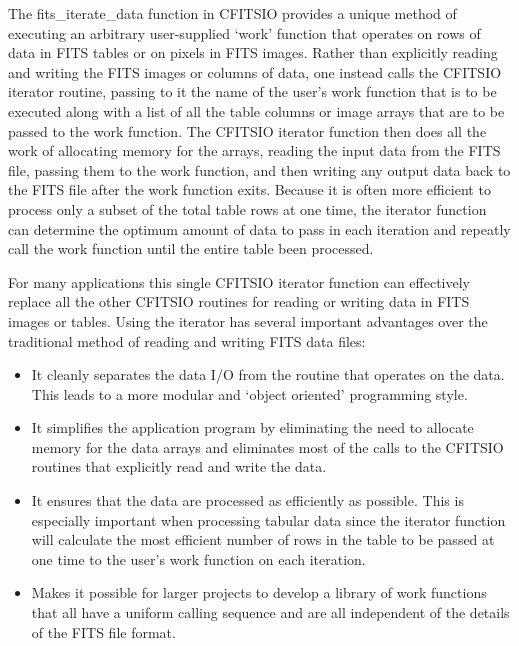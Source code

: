 \documentclass[11pt]{book}
\begin{document}
The fits\_iterate\_data function in CFITSIO provides a unique method of
executing an arbitrary user-supplied `work' function that operates on
rows of data in  FITS tables or on pixels in FITS images.  Rather than
explicitly reading and writing the FITS images or columns of data, one
instead calls the CFITSIO iterator routine, passing to it the name of
the user's work function that is to be executed along with a list of
all the table columns or image arrays that are to be passed to the work
function.  The CFITSIO iterator function then does all the work of
allocating memory for the arrays, reading the input data from the FITS
file, passing them to the work function, and then writing any output
data back to the FITS file after the work function exits.  Because
it is often more efficient to process only a subset of the total table
rows at one time, the iterator function can determine the optimum
amount of data to pass in each iteration and repeatly call the work
function until the entire table been processed.

For many applications this single CFITSIO iterator function can
effectively replace all the other CFITSIO routines for reading or
writing data in FITS images or tables.  Using the iterator has several
important advantages over the traditional method of reading and writing
FITS data files:

\begin{itemize}
\item
It cleanly separates the data I/O from the routine that operates on
the data.  This leads to a more modular and `object oriented'
programming style.

\item
It simplifies the application program by eliminating the need to allocate
memory for the data arrays and eliminates most of the calls to the CFITSIO
routines that explicitly read and write the data.

\item
It ensures that the data are processed as efficiently as possible.
This is especially important when processing tabular data since
the iterator function will calculate the most efficient number
of rows in the table to be passed at one time to the user's work
function on each iteration.

\item
Makes it possible for larger projects to develop a library of work
functions that all have a uniform calling sequence and are all
independent of the details of the FITS file format.

\end{itemize}
\end{document}
